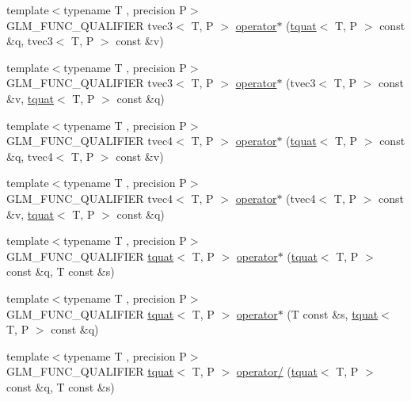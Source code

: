 \begin{DoxyCompactItemize}
\item 
{\footnotesize template$<$typename T , precision P$>$ }\\G\+L\+M\+\_\+\+F\+U\+N\+C\+\_\+\+Q\+U\+A\+L\+I\+F\+I\+E\+R tvec3$<$ T, P $>$ \hyperlink{group__gtc__quaternion_ga5b0cccc7f163f2b7bbf3536deb403d9a}{operator$\ast$} (\hyperlink{structglm_1_1tquat}{tquat}$<$ T, P $>$ const \&q, tvec3$<$ T, P $>$ const \&v)
\item 
{\footnotesize template$<$typename T , precision P$>$ }\\G\+L\+M\+\_\+\+F\+U\+N\+C\+\_\+\+Q\+U\+A\+L\+I\+F\+I\+E\+R tvec3$<$ T, P $>$ \hyperlink{group__gtc__quaternion_ga70dbac44fc9fb59659218ad4ed7870ed}{operator$\ast$} (tvec3$<$ T, P $>$ const \&v, \hyperlink{structglm_1_1tquat}{tquat}$<$ T, P $>$ const \&q)
\item 
{\footnotesize template$<$typename T , precision P$>$ }\\G\+L\+M\+\_\+\+F\+U\+N\+C\+\_\+\+Q\+U\+A\+L\+I\+F\+I\+E\+R tvec4$<$ T, P $>$ \hyperlink{group__gtc__quaternion_gaeee3d385665cb25b6d728524b8d8fa66}{operator$\ast$} (\hyperlink{structglm_1_1tquat}{tquat}$<$ T, P $>$ const \&q, tvec4$<$ T, P $>$ const \&v)
\item 
{\footnotesize template$<$typename T , precision P$>$ }\\G\+L\+M\+\_\+\+F\+U\+N\+C\+\_\+\+Q\+U\+A\+L\+I\+F\+I\+E\+R tvec4$<$ T, P $>$ \hyperlink{group__gtc__quaternion_ga9f4715d30e26cde878f16fef75b8e049}{operator$\ast$} (tvec4$<$ T, P $>$ const \&v, \hyperlink{structglm_1_1tquat}{tquat}$<$ T, P $>$ const \&q)
\item 
{\footnotesize template$<$typename T , precision P$>$ }\\G\+L\+M\+\_\+\+F\+U\+N\+C\+\_\+\+Q\+U\+A\+L\+I\+F\+I\+E\+R \hyperlink{structglm_1_1tquat}{tquat}$<$ T, P $>$ \hyperlink{group__gtc__quaternion_ga64f3ff448c382fd6642eafddd6ff65ea}{operator$\ast$} (\hyperlink{structglm_1_1tquat}{tquat}$<$ T, P $>$ const \&q, T const \&s)
\item 
{\footnotesize template$<$typename T , precision P$>$ }\\G\+L\+M\+\_\+\+F\+U\+N\+C\+\_\+\+Q\+U\+A\+L\+I\+F\+I\+E\+R \hyperlink{structglm_1_1tquat}{tquat}$<$ T, P $>$ \hyperlink{group__gtc__quaternion_ga8b18b7e92f80b6b26550a1035bca33ba}{operator$\ast$} (T const \&s, \hyperlink{structglm_1_1tquat}{tquat}$<$ T, P $>$ const \&q)
\item 
{\footnotesize template$<$typename T , precision P$>$ }\\G\+L\+M\+\_\+\+F\+U\+N\+C\+\_\+\+Q\+U\+A\+L\+I\+F\+I\+E\+R \hyperlink{structglm_1_1tquat}{tquat}$<$ T, P $>$ \hyperlink{group__gtc__quaternion_gab52fd3ac627908aa2aa1df96ddcdd113}{operator/} (\hyperlink{structglm_1_1tquat}{tquat}$<$ T, P $>$ const \&q, T const \&s)

\end{DoxyCompactItemize}
